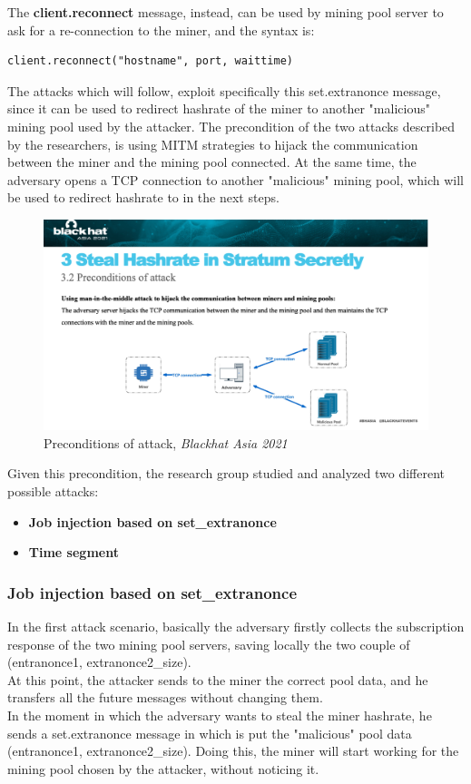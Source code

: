 \noindent The \textbf{client.reconnect} message, instead, can be used by mining pool server to ask for a re-connection to the miner, and the syntax is:
\begin{verbatim}
client.reconnect("hostname", port, waittime)
\end{verbatim}
\medskip

\noindent The attacks which will follow, exploit specifically this set.extranonce message, since it can be used to redirect hashrate of the miner to another "malicious" mining pool used by the attacker. The precondition of the two attacks described by the researchers, is using MITM strategies to hijack the communication between the miner and the mining pool connected. At the same time, the adversary opens a TCP connection to another "malicious" mining pool, which will be used to redirect hashrate to in the next steps.

\begin{figure}[h!]
    \centering
    \includegraphics[width=15cm]{Figures/stratum/stratum4.png}
    \caption{Preconditions of attack, \textit{Blackhat Asia 2021}}
    \label{fig:stratum4}
\end{figure}

\noindent Given this precondition, the research group studied and analyzed two different possible attacks:
\begin{itemize}
    \item \textbf{Job injection based on set\_extranonce}
    \item \textbf{Time segment}
\end{itemize}

\subsubsection{\textbf{Job injection based on set\_extranonce}}
\noindent In the first attack scenario, basically the adversary firstly collects the subscription response of the two mining pool servers, saving locally the two couple of (entranonce1, extranonce2\_size).\\
At this point, the attacker sends to the miner the correct pool data, and he transfers all the future messages without changing them.\\
In the moment in which the adversary wants to steal the miner hashrate, he sends a set.extranonce message in which is put the "malicious" pool data (entranonce1, extranonce2\_size). 
Doing this, the miner will start working for the mining pool chosen by the attacker, without noticing it.

